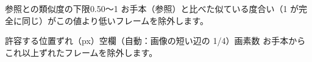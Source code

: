 \begin{setting}{ 参照との類似度の下限}{0.5}{0〜1}
  お手本（参照）と比べた似ている度合い（1 が完全に同じ）がこの値より低いフレームを除外します。
\end{setting}

\begin{setting}{ 許容する位置ずれ（px）}{空欄（自動：画像の短い辺の 1/4）}{画素数}
  お手本からこれ以上ずれたフレームを除外します。
\end{setting}
